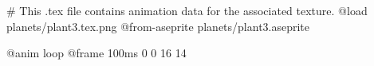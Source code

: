 # This .tex file contains animation data for the associated texture.
@load planets/plant3.tex.png
@from-aseprite planets/plant3.aseprite

@anim loop
	@frame 100ms 0 0 16 14
